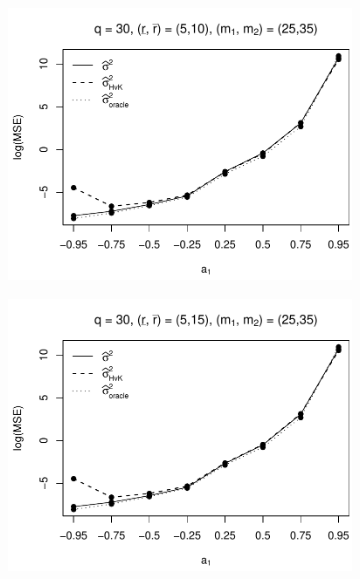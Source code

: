 \begin{figure}[p]
\begin{subfigure}[b]{0.45\textwidth}
\includegraphics[width=\textwidth]{Plots/Plots_Supplement/MSE_lrv_T=500_slope=1_(L1,L2,K1,K2,M1,M2)=(30,30,5,10,25,35).pdf}
\end{subfigure}
\hspace{0.25cm}
\begin{subfigure}[b]{0.45\textwidth}
\includegraphics[width=\textwidth]{Plots/Plots_Supplement/MSE_lrv_T=500_slope=1_(L1,L2,K1,K2,M1,M2)=(30,30,5,15,25,35).pdf}
\end{subfigure}


\end{figure}
